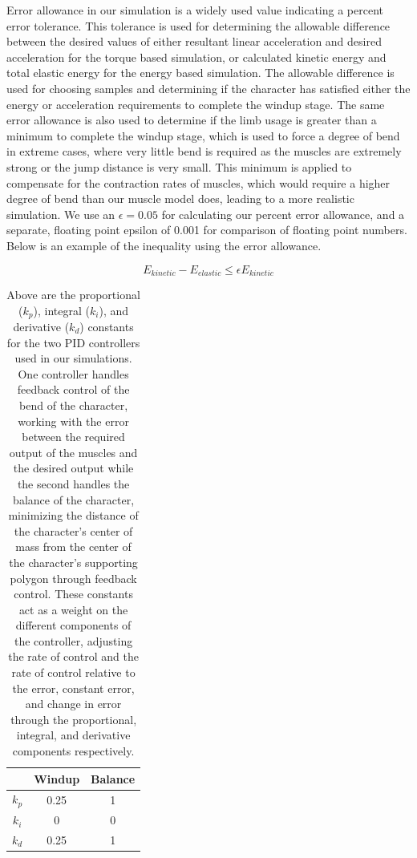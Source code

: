 Error allowance in our simulation is a widely used value indicating a percent error tolerance.  This tolerance is used for determining the allowable difference between the desired values of either resultant linear acceleration and desired acceleration for the torque based simulation, or calculated kinetic energy and total elastic energy for the energy based simulation.  The allowable difference is used for choosing samples and determining if the character has satisfied either the energy or acceleration requirements to complete the windup stage.  The same error allowance is also used to determine if the limb usage is greater than a minimum to complete the windup stage, which is used to force a degree of bend in extreme cases, where very little bend is required as the muscles are extremely strong or the jump distance is very small.  This minimum is applied to compensate for the contraction rates of muscles, which would require a higher degree of bend than our muscle model does, leading to a more realistic simulation.  We use an $\epsilon=0.05$ for calculating our percent error allowance, and a separate, floating point epsilon of 0.001 for comparison of floating point numbers.  Below is an example of the inequality using the error allowance.  

\[
	E_{kinetic} - E_{elastic} \le \epsilon E_{kinetic}
\]

\begin{table}[ht]
	\centering
	\begin{tabular}{|c|c|c|}
		\hline
		& Windup & Balance \\ \hline
		$k_p$ & 0.25 & 1 \\ \hline
		$k_i$ & 0 & 0 \\ \hline
		$k_d$ & 0.25 & 1 \\ \hline
	\end{tabular}
	\caption[PID controller constants for our simulation]{Above are the proportional ($k_p$), integral ($k_i$), and derivative ($k_d$) constants for the two PID controllers used in our simulations.  One controller handles feedback control of the bend of the character, working with the error between the required output of the muscles and the desired output while the second handles the balance of the character, minimizing the distance of the character's center of mass from the center of the character's supporting polygon through feedback control.  These constants act as a weight on the different components of the controller, adjusting the rate of control and the rate of control relative to the error, constant error, and change in error through the proportional, integral, and derivative components respectively.}
	\label{tab:pd_constants}
\end{table}

